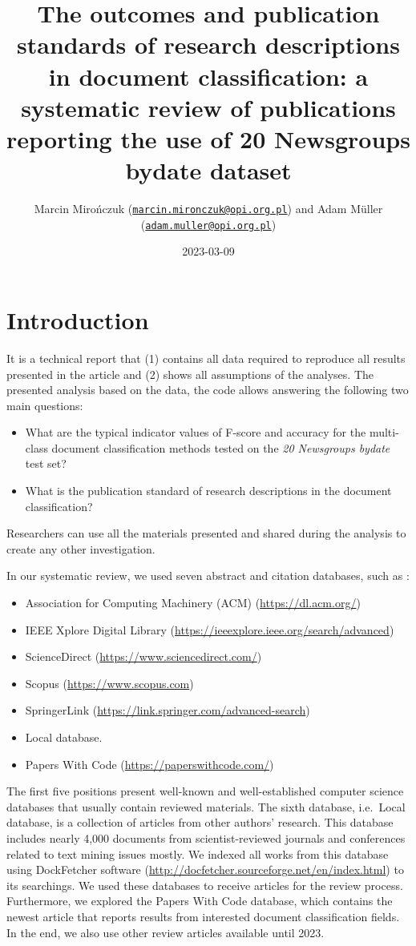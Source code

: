 \documentclass[
]{article}
\title{The outcomes and publication standards of research descriptions in document classification: a systematic review of publications reporting the use of 20 Newsgroups bydate dataset}
\author{Marcin Mirończuk (\href{mailto:marcin.mironczuk@opi.org.pl}{\nolinkurl{marcin.mironczuk@opi.org.pl}}) and Adam Müller (\href{mailto:adam.muller@opi.org.pl}{\nolinkurl{adam.muller@opi.org.pl}})}
\date{2023-03-09}
\providecommand{\tightlist}{%
  \setlength{\itemsep}{0pt}\setlength{\parskip}{0pt}}
\begin{document}
\maketitle

{
\setcounter{tocdepth}{2}
\tableofcontents
}
\hypertarget{introduction}{%
\section{Introduction}\label{introduction}}

It is a technical report that (1) contains all data required to reproduce all results presented in the article and (2) shows all assumptions of the analyses. The presented analysis based on the data, the code allows answering the following two main questions:

\begin{itemize}
\tightlist
\item
  What are the typical indicator values of F-score and accuracy for the multi-class document classification methods tested on the \emph{20 Newsgroups bydate} test set?
\item
  What is the publication standard of research descriptions in the document classification?
\end{itemize}

Researchers can use all the materials presented and shared during the analysis to create any other investigation.

In our systematic review, we used seven abstract and citation databases, such as :

\begin{itemize}
\tightlist
\item
  Association for Computing Machinery (ACM) (\url{https://dl.acm.org/})
\item
  IEEE Xplore Digital Library (\url{https://ieeexplore.ieee.org/search/advanced})
\item
  ScienceDirect (\url{https://www.sciencedirect.com/})
\item
  Scopus (\url{https://www.scopus.com})
\item
  SpringerLink (\url{https://link.springer.com/advanced-search})
\item
  Local database.
\item
  Papers With Code (\url{https://paperswithcode.com/})
\end{itemize}

The first five positions present well-known and well-established computer science databases that usually contain reviewed materials. The sixth database, i.e.~Local database, is a collection of articles from other authors' research. This database includes nearly 4,000 documents from scientist-reviewed journals and conferences related to text mining issues mostly. We indexed all works from this database using DockFetcher software (\url{http://docfetcher.sourceforge.net/en/index.html}) to its searchings. We used these databases to receive articles for the review process. Furthermore, we explored the Papers With Code database, which contains the newest article that reports results from interested document classification fields. In the end, we also use other review articles available until 2023.
\end{document}
